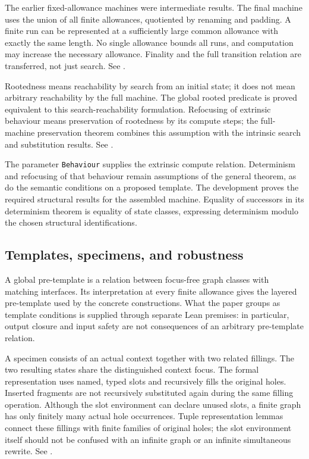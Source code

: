 The earlier fixed-allowance machines were intermediate results. The final
machine uses the union of all finite allowances, quotiented by renaming and
padding. A finite run can be represented at a sufficiently large common
allowance with exactly the same length. No single allowance bounds all runs,
and computation may increase the necessary allowance. Finality and the
full transition relation are transferred, not just search.
See .

Rootedness means reachability by search from an initial state; it does not
mean arbitrary reachability by the full machine. The global rooted predicate
is proved equivalent to this search-reachability formulation. Refocusing of
extrinsic behaviour means preservation of rootedness by its compute steps;
the full-machine preservation theorem combines this assumption with the
intrinsic search and substitution results.
See .

The parameter \texttt{Behaviour} supplies the extrinsic compute relation.
Determinism and refocusing of that behaviour remain assumptions of the general
theorem, as do the semantic conditions on a proposed template. The development
proves the required structural results for the assembled machine. Equality of
successors in its determinism theorem is equality of state classes, expressing
determinism modulo the chosen structural identifications.

\subsection{Templates, specimens, and robustness}

A global pre-template is a relation between focus-free graph classes with
matching interfaces. Its interpretation at every finite allowance gives the
layered pre-template used by the concrete constructions. What the paper groups
as template conditions is supplied through separate Lean premises: in
particular, output closure and input safety are not consequences of an
arbitrary pre-template relation.

A specimen consists of an actual context together with two related fillings.
The two resulting states share the distinguished context focus. The formal
representation uses named, typed slots and recursively fills the original
holes. Inserted fragments are not recursively substituted again during the
same filling operation. Although the slot environment can declare unused
slots, a finite graph has only finitely many actual hole occurrences. Tuple
representation lemmas connect these fillings with finite families of original
holes; the slot environment itself should not be confused with an infinite
graph or an infinite simultaneous rewrite.
See .

